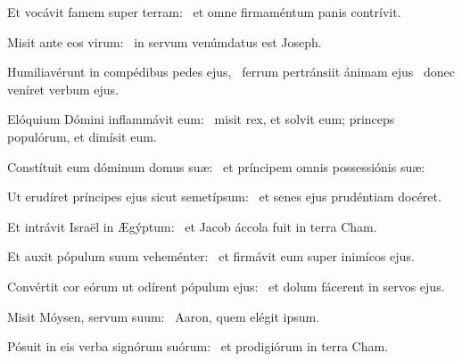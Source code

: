 
\item Et vocávit famem super terram:~\psstar{} et omne firmaméntum panis contrívit.

\item Misit ante eos virum:~\psstar{} in servum venúmdatus est Joseph.

\item Humiliavérunt in compédibus pedes ejus,~\pscross{} ferrum pertránsiit ánimam ejus~\psstar{} donec veníret verbum ejus.

\item Elóquium Dómini inflammávit eum:~\psstar{} misit rex, et solvit eum; princeps populórum, et dimísit eum.

\item Constítuit eum dóminum domus suæ:~\psstar{} et príncipem omnis possessiónis suæ:

\item Ut erudíret príncipes ejus sicut semetípsum:~\psstar{} et senes ejus prudéntiam docéret.

\item Et intrávit Israël in Ægýptum:~\psstar{} et Jacob áccola fuit in terra Cham.

\item Et auxit pópulum suum veheménter:~\psstar{} et firmávit eum super inimícos ejus.

\item Convértit cor eórum ut odírent pópulum ejus:~\psstar{} et dolum fácerent in servos ejus.

\item Misit Móysen, servum suum:~\psstar{} Aaron, quem elégit ipsum.

\item Pósuit in eis verba signórum suórum:~\psstar{} et prodigiórum in terra Cham.
